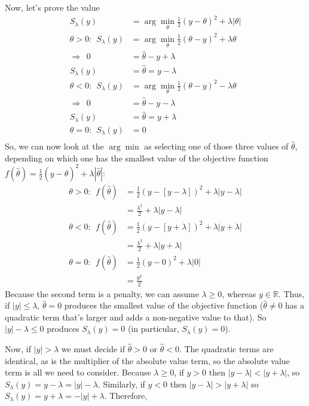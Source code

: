 \documentclass{article}
\begin{document}
Now, let's prove the value 
\begin{align*}
S_\lambda(y)&=\arg\min_\theta \frac{1}{2}(y-\theta)^2+\lambda|\theta|\\
\theta > 0:~~ S_\lambda(y)&=\arg\min_\theta \frac{1}{2}(\theta-y)^2+\lambda\theta\\
\Rightarrow~~ 0&=\hat{\theta} - y + \lambda\\
S_\lambda(y)&=\hat{\theta}=y-\lambda\\
\theta < 0:~~ S_\lambda(y)&=\arg\min_\theta \frac{1}{2}(\theta-y)^2-\lambda\theta\\
\Rightarrow~~ 0&=\hat{\theta} - y - \lambda\\
S_\lambda(y)&=\hat{\theta}=y+\lambda\\
\theta = 0:~~ S_\lambda(y)&=0\\
\end{align*}
So, we can now look at the $\arg\min$ as selecting one of those three values of $\hat{\theta}$, depending
on which one has the smallest value of the objective function $f(\hat{\theta})=\frac{1}{2}(y-\hat{\theta})^2+\lambda|\hat{\theta}|$:
\begin{align*}
\theta > 0: ~~ f(\hat{\theta})&=\frac{1}{2}(y-[y-\lambda])^2+\lambda|y-\lambda|\\
&= \frac{\lambda^2}{2} + \lambda|y-\lambda|\\
\theta < 0: ~~f(\hat{\theta})&=\frac{1}{2}(y - [y+\lambda])^2+\lambda|y+\lambda|\\
&= \frac{\lambda^2}{2} + \lambda|y + \lambda|\\
\theta = 0: ~~f(\hat{\theta}) &= \frac{1}{2}(y-0)^2+\lambda|0|\\
&=\frac{y^2}{2}
\end{align*}
Because the second term is a penalty, we can assume $\lambda\geq0$, whereas $y\in\mathbb{R}$. Thus, if $|y| \leq \lambda$, $\hat{\theta}=0$ produces the smallest value of the objective function ($\hat{\theta}\neq0$ has a quadratic term that's larger and adds a non-negative value to that). So $|y|-\lambda\leq0$ produces $S_\lambda(y)=0$ (in particular, $S_\lambda(y)=0$).

Now, if $|y|>\lambda$ we must decide if $\hat{\theta}>0$ or $\hat{\theta}<0$. The quadratic terms are identical, as
is the multiplier of the absolute value term, so the absolute value term is all we need to consider.
Because $\lambda\geq0$, if $y>0$ then $|y-\lambda|<|y+\lambda|$, so $S_\lambda(y)=y-\lambda=|y|-\lambda$. Similarly, if $y<0$ then $|y-\lambda|>|y+\lambda|$ so $S_\lambda(y)=y+\lambda=-|y|+\lambda$. Therefore,
\end{document}

